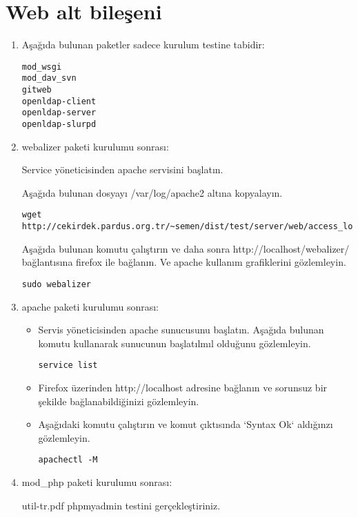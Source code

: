 \documentclass[a4paper,10pt]{article}
\begin{document}
\section{Web alt bileşeni}
\begin{enumerate}
\item Aşağıda bulunan paketler sadece kurulum testine tabidir:
\begin{verbatim}
mod_wsgi
mod_dav_svn
gitweb
openldap-client
openldap-server
openldap-slurpd
\end{verbatim}

\item webalizer paketi kurulumu sonrası:

Service yöneticisinden apache servisini başlatın.

Aşağıda bulunan dosyayı /var/log/apache2 altına kopyalayın.
\begin{verbatim}
wget http://cekirdek.pardus.org.tr/~semen/dist/test/server/web/access_log
\end{verbatim}

Aşağıda bulunan komutu çalıştırın ve daha sonra http://localhost/webalizer/ bağlantısına firefox ile bağlanın. Ve apache kullanım grafiklerini gözlemleyin.
\begin{verbatim}
sudo webalizer
\end{verbatim}

\item apache paketi kurulumu sonrası:
\begin{itemize}
\item Servis yöneticisinden apache sunucusunu başlatın. Aşağıda bulunan komutu kullanarak sunucunun başlatılmıl olduğunu gözlemleyin.
\begin{verbatim}
service list
\end{verbatim}
\item Firefox üzerinden http://localhost adresine bağlanın ve sorunsuz bir şekilde bağlanabildiğinizi gözlemleyin. 
\item Aşağıdaki komutu çalıştırın ve komut çıktısında `Syntax Ok` aldığınzı gözlemleyin.
\begin{verbatim}
apachectl -M 
\end{verbatim}

\end{itemize}

\item mod\_php paketi kurulumu sonrası:

util-tr.pdf phpmyadmin testini gerçekleştiriniz.

\end{enumerate}
\end{document}
